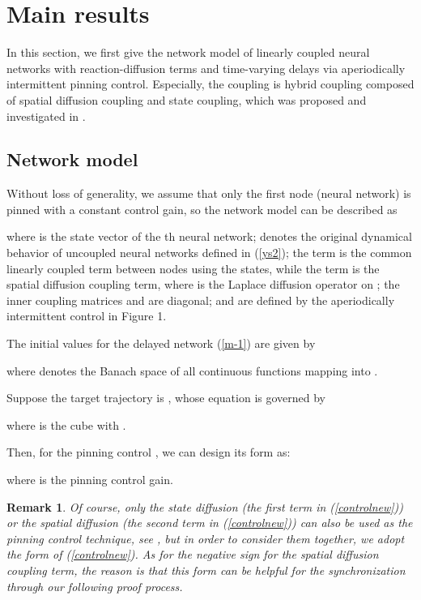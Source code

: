 \documentclass[review]{elsarticle}
\newtheorem{rem}{Remark}
\begin{document}
\section{Main results}\label{main}
In this section, we first give the network model of linearly coupled neural networks with reaction-diffusion terms and time-varying delays via aperiodically intermittent pinning control. Especially, the coupling is hybrid coupling composed of spatial diffusion coupling and state coupling, which was proposed and investigated in \cite{WW2014,WWHR2016}.

\subsection{Network model}
Without loss of generality, we assume that only
the first node (neural network) is pinned with a constant control gain, so the network model can be described as

where  is the state vector of the th neural network;  denotes the original dynamical behavior of uncoupled neural networks defined in (\ref{ys2}); the term  is the common linearly coupled term between nodes using the states, while the term  is the spatial diffusion coupling term, where  is the Laplace diffusion operator on ; the inner coupling matrices  and  are diagonal;  and  are defined by the aperiodically intermittent control in Figure 1.

The initial values for the delayed network (\ref{m-1}) are given by

where  denotes the Banach space of all continuous functions mapping  into .

Suppose the target trajectory is , whose equation is governed by

where  is the cube with .

Then, for the pinning control , we can design its form as:

where  is the pinning control gain.

\begin{rem}
Of course, only the state diffusion (the first term in (\ref{controlnew})) or the spatial diffusion (the second term in (\ref{controlnew})) can also be used as the pinning control technique, see \cite{WWHR2016}, but in order to consider them together, we adopt the form of (\ref{controlnew}). As for the negative sign for the spatial diffusion coupling term, the reason is that this form can be helpful for the synchronization through our following proof process.
\end{rem}
\end{document}
